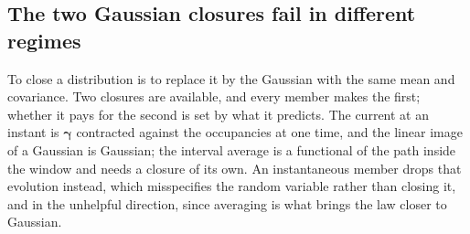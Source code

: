 \subsection*{The two Gaussian closures fail in different regimes}

To close a distribution is to replace it by the Gaussian with the same mean and covariance. Two
closures are available, and every member makes the first; whether it pays for the second is set by
what it predicts. The current at an instant is $\boldsymbol{\gamma}$ contracted against the occupancies at
one time, and the linear image of a Gaussian is Gaussian; the interval average is a functional of
the path inside the window and needs a closure of its own. An instantaneous member drops that
evolution instead, which misspecifies the random variable rather than closing it, and in the
unhelpful direction, since averaging is what brings the law closer to Gaussian.

